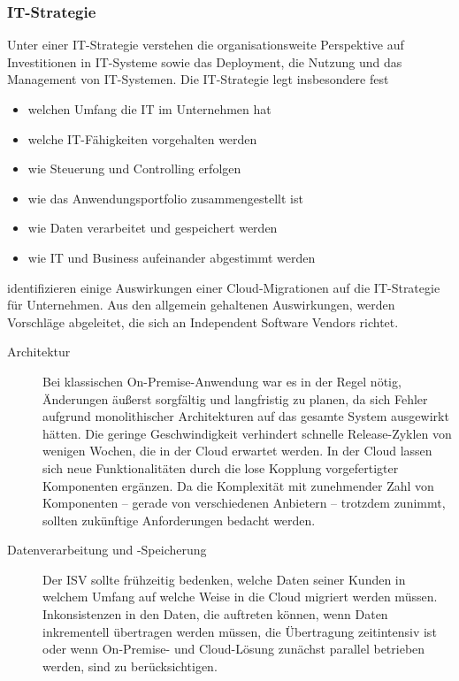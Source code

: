 \subsubsection{IT-Strategie}
Unter einer IT-Strategie 
verstehen  die 
organisationsweite Perspektive auf Investitionen in IT-Systeme sowie das 
Deployment, die Nutzung und das Management von IT-Systemen. Die IT-Strategie 
legt insbesondere fest
\begin{itemize}
	\item welchen Umfang die IT im Unternehmen hat
	\item welche IT-Fähigkeiten vorgehalten werden
	\item wie Steuerung und Controlling erfolgen
	\item wie das Anwendungsportfolio zusammengestellt ist
	\item wie Daten verarbeitet und gespeichert werden
	\item wie IT und Business aufeinander abgestimmt werden
\end{itemize}
identifizieren einige Auswirkungen einer Cloud-Migrationen auf die IT-Strategie 
für Unternehmen. Aus den allgemein gehaltenen Auswirkungen, werden Vorschläge 
abgeleitet, die sich an Independent Software Vendors richtet.
\begin{description}
  \item[Architektur] Bei klassischen On-Premise-Anwendung war es in der Regel 
nötig, Änderungen äußerst sorgfältig und langfristig zu planen, da sich Fehler 
aufgrund monolithischer Architekturen auf das gesamte System ausgewirkt hätten. 
Die geringe Geschwindigkeit verhindert schnelle Release-Zyklen von 
wenigen Wochen, die in der Cloud erwartet werden. In der Cloud lassen sich neue 
Funktionalitäten durch die lose Kopplung vorgefertigter Komponenten ergänzen. 
 Da die 
Komplexität mit zunehmender Zahl von Komponenten -- gerade von verschiedenen 
Anbietern -- trotzdem zunimmt, sollten zukünftige Anforderungen bedacht werden.
  \item[Datenverarbeitung und -Speicherung] Der ISV sollte frühzeitig bedenken, 
welche Daten seiner Kunden in welchem Umfang auf welche Weise in die Cloud 
migriert werden müssen. Inkonsistenzen in den Daten, die auftreten können, wenn 
Daten inkrementell übertragen werden müssen, die Übertragung zeitintensiv ist 
oder wenn On-Premise- und Cloud-Lösung zunächst parallel betrieben werden, 
sind zu berücksichtigen. \\
\end{description}

